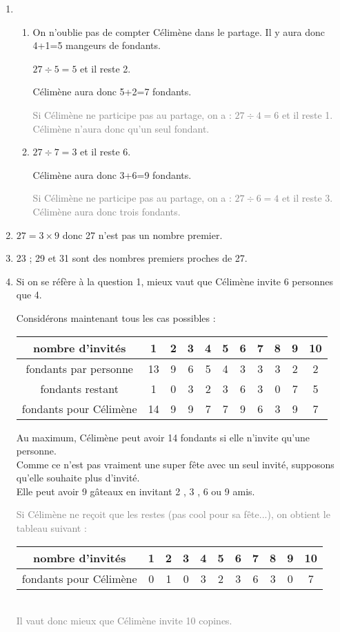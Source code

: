 \begin{enumerate}
    \item \begin{enumerate}[label=(\alph*)]
        \item {} On n'oublie pas de compter Célimène dans le partage. Il y aura donc 4+1=5 mangeurs de fondants.
        
        $27\div5=5$ et il reste 2. 
        
        Célimène aura donc 5+2=7 fondants.

        \textcolor{gray}{Si Célimène ne participe pas au partage, on a : $27\div4=6$ et il reste 1. Célimène n'aura donc qu'un seul fondant.}

        \item {} $27\div7=3$ et il reste 6. 
        
        Célimène aura donc 3+6=9 fondants.

        \textcolor{gray}{Si Célimène ne participe pas au partage, on a : $27\div6=4$ et il reste 3. Célimène aura donc trois fondants.}
    \end{enumerate}
    \item {} $27=3\times9$ donc 27 n'est pas un nombre premier.
    \item {} 23 ; 29 et 31 sont des nombres premiers proches de 27.
    \item {} Si on se réfère à la question 1, mieux vaut que Célimène invite 6 personnes que 4. 
    
    Considérons maintenant tous les cas possibles : 

    \begin{tabular}{c*{10}{|c}}
        nombre d'invités & 1 & 2 & 3 & 4 & 5 & 6 & 7 & 8 & 9 & 10\\\hline
        fondants par personne &13 & 9 & 6 & 5 & 4 & 3 & 3 & 3 & 2 & 2\\\hline
        fondants restant & 1 & 0 & 3 & 2 & 3 &6 & 3 & 0 & 7 & 5\\\hline
        fondants pour Célimène & 14 & 9 & 9 & 7 & 7 & 9 & 6 & 3 & 9 & 7
    \end{tabular}

    Au maximum, Célimène peut avoir 14 fondants si elle n'invite qu'une personne. \\Comme ce n'est pas vraiment une super fête avec un seul invité, supposons qu'elle souhaite plus d'invité. 
    \\ Elle peut avoir 9 gâteaux en invitant 2 , 3 , 6 ou 9 amis. 

    \textcolor{gray}{Si Célimène ne reçoit que les restes (pas cool pour sa fête...), on obtient le tableau suivant :\\[1ex]
    \begin{tabular}{c*{10}{|c}}
        nombre d'invités & 1 & 2 & 3 & 4 & 5 & 6 & 7 & 8 & 9 & 10\\\hline
        fondants pour Célimène & 0 & 1 & 0 & 3 & 2 & 3 & 6 & 3 & 0 & 7
    \end{tabular}\\[1ex]
    Il vaut donc  mieux que Célimène invite 10 copines.}

\end{enumerate}

